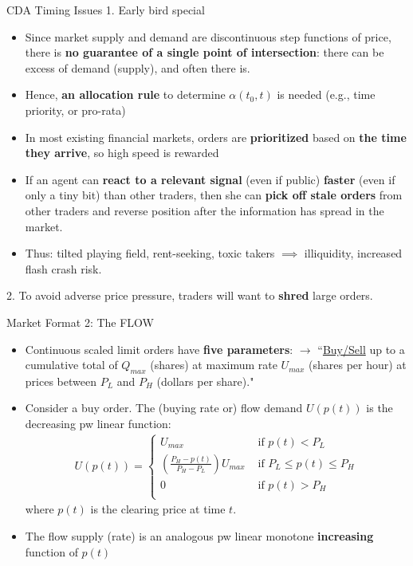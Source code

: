 \documentclass[10pt]{beamer}
\begin{document}
\begin{frame}{CDA Timing Issues}
1. Early bird special  
    \begin{itemize}
        \item Since market supply and demand are discontinuous step functions of price, there is \textbf{no guarantee of a single point of intersection}: there can be excess of demand (supply), and often there is. 
        \item Hence, \textbf{an allocation rule} to determine $\alpha(t_0, t)$ is needed (e.g., time priority, or pro-rata)
\item In most existing financial markets, orders are \textbf{prioritized} based on \textbf{the time they arrive}, so high speed is rewarded
\item If an agent can \textbf{react to a relevant signal} (even if public) \textbf{faster} (even if only a tiny bit) than other traders, then she can \textbf{pick off stale orders} from other traders and reverse position after the information has spread in the market.
\item  Thus: tilted playing field, rent-seeking, toxic takers $\implies$ illiquidity, increased flash crash risk.
    \end{itemize}
    2. To avoid adverse price pressure, traders will want to \textbf{shred} large orders.
    \end{frame}

\begin{frame}{Market Format 2: The FLOW}
    \begin{itemize}
\item Continuous scaled limit orders have \textbf{five parameters}: $\rightarrow$ ``\underline{Buy/Sell} up to a cumulative total of  \underline{$Q_{max}$} (shares) at maximum rate \underline{$U_{max}$} (shares per hour) at prices between \underline{$P_{L}$} and \underline{$P_{H}$} (dollars per share)."
\item Consider a buy order. The (buying rate or) flow demand $U(p(t))$ is the decreasing pw linear function:
\begin{align}
                U{(p(t))}=
                \begin{cases}
                    U_{max} & \text{ if } p{(t)} < P_{L} \\
                    (\frac{P_{H}-p(t)}{P_{H}-P_{L}})U_{max} & \text{ if } P_L \leq p{(t)} \leq P_H \\
                    0  & \text{ if } p{(t)} > P_{H} \\
                \end{cases}
\end{align}
        where $p(t)$ is the clearing price at time $t$.
\item The flow supply (rate) is an analogous pw linear monotone \textbf{increasing} function of $p(t)$
    \end{itemize}
\end{frame}
\end{document}
